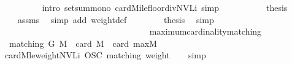 \begin{isabellebody}
\ \ \ \ \ \ \ \ \isamarkupfalse%
\ {\isacharparenleft}intro\ setsum{\isacharunderscore}mono\ card{\isacharunderscore}Mi{\isacharunderscore}le{\isacharunderscore}floor{\isacharunderscore}div{\isacharunderscore}{}{\isacharunderscore}NVLi{\isacharcomma}\ simp{\isacharparenright}\isanewline
\ \ \ \ \isamarkupfalse%
\isanewline
\ \ \ \ \isamarkupfalse%
\ {\isacharquery}thesis\ \isamarkupfalse%
\ {}\ {}\ {}\ assms\ \isamarkupfalse%
\ {\isacharparenleft}simp\ add{\isacharcolon}\ weight{\isacharunderscore}def{\isacharparenright}\isanewline
\ \ \isamarkupfalse%
\isanewline
\ \ \isamarkupfalse%
\ \isamarkupfalse%
\ {\isacharquery}thesis\ \isamarkupfalse%
\ simp\isanewline
{}\isamarkupfalse%
%
\endisatagproof
{\isafoldproof}%
%
\isadelimproof
\ \ \ \ \ \ \ \ \ \ \ \ \ \ \ \ \ \ \ \ \ \ \ \ \ \ \ \ \ \ \ \ \ \isanewline
%
\endisadelimproof
\isanewline
{}\isamarkupfalse%
\ maximum{\isacharunderscore}cardinality{\isacharunderscore}matching{\isacharcolon}\isanewline
\ \ {\isachardoublequoteopen}matching\ G\ M{\isacharprime}\ {\isasymlongrightarrow}\ card\ M{\isacharprime}\ {\isasymle}\ card\ maxM{\isachardoublequoteclose}\isanewline
%
\isadelimproof
\ \ %
\endisadelimproof
%
\isatagproof
{}\isamarkupfalse%
\ card{\isacharunderscore}M{\isacharunderscore}le{\isacharunderscore}weight{\isacharunderscore}NVLi\ OSC\ matching\ weight\isanewline
\ \ \isamarkupfalse%
\ simp%
\endisatagproof
{\isafoldproof}%
%
\isadelimproof
\isanewline
%
\endisadelimproof
\isanewline
{}\isamarkupfalse%
\isanewline
%
\isadelimtheory
\isanewline
%
\endisadelimtheory
%
\isatagtheory
{}\isamarkupfalse%
%
\endisatagtheory
{\isafoldtheory}%
%
\isadelimtheory
%
\endisadelimtheory
\end{isabellebody}%
